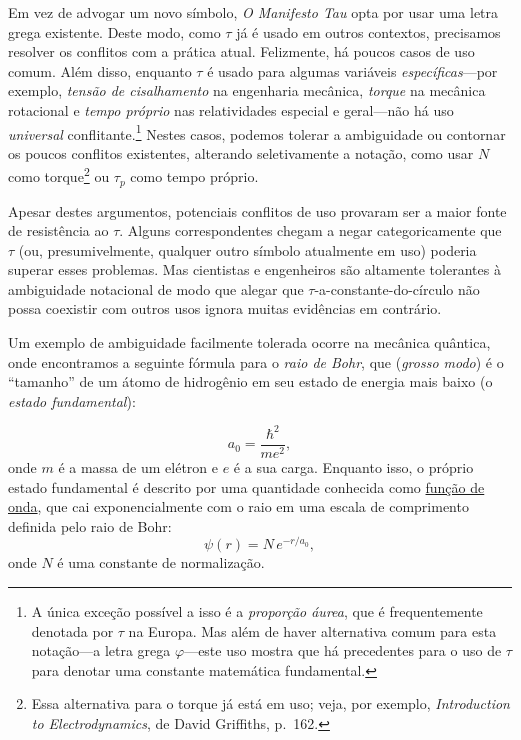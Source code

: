 Em vez de advogar um novo símbolo, \emph{O Manifesto Tau} opta por usar uma letra grega existente. Deste modo, como $\tau$ já é usado em outros contextos, precisamos resolver os conflitos com a prática atual. Felizmente, há poucos casos de uso comum. Além disso, enquanto $\tau$ é usado para algumas variáveis \emph{específicas}---por exemplo, \emph{tensão de cisalhamento} na engenharia mecânica, \emph{torque} na mecânica rotacional e \emph{tempo próprio} nas relatividades especial e geral---não há uso \emph{universal} conflitante.\footnote{A única exceção possível a isso é a \emph{proporção áurea}, que é frequentemente denotada por $\tau$ na Europa. Mas além de haver alternativa comum para esta notação---a letra grega $\varphi$---este uso mostra que há precedentes para o uso de $\tau$ para denotar uma constante matemática fundamental.} Nestes casos, podemos tolerar a ambiguidade ou contornar os poucos conflitos existentes, alterando seletivamente a notação, como usar $N$ como torque\footnote{Essa alternativa para o torque já está em uso; veja, por exemplo, \emph{Introduction to Electrodynamics}, de David Griffiths, p.~162.} ou $\tau_p$ como tempo próprio.

Apesar destes argumentos, potenciais conflitos de uso provaram ser a maior fonte de resistência ao $\tau$. Alguns correspondentes chegam a negar categoricamente que $\tau$ (ou, presumivelmente, qualquer outro símbolo atualmente em uso) poderia superar esses problemas. Mas cientistas e engenheiros são altamente tolerantes à ambiguidade notacional de modo que alegar que $\tau$-a-constante-do-círculo não possa coexistir com outros usos ignora muitas evidências ​​em contrário.

Um exemplo de ambiguidade facilmente tolerada ocorre na mecânica quântica, onde encontramos a seguinte fórmula para o \emph{raio de Bohr}, que (\emph{grosso modo}) é o ``tamanho'' de um átomo de hidrogênio em seu estado de energia mais baixo (o \emph{estado fundamental}):

\[
a_0 = \frac{\hbar^2}{m e^2},
\]
onde $m$ é a massa de um elétron e $e$ é a sua carga. Enquanto isso, o próprio estado fundamental é descrito por uma quantidade conhecida como \href{https://pt.wikipedia.org/wiki/Fun%C3%A7%C3%A3o_de_onda}{função de onda}, que cai exponencialmente com o raio em uma escala de comprimento definida pelo raio de Bohr:
\begin{equation}
\label{eq:hydrogen}
\psi(r) = N\,e^{-r/a_0},
\end{equation}
onde $N$ é uma constante de normalização.

